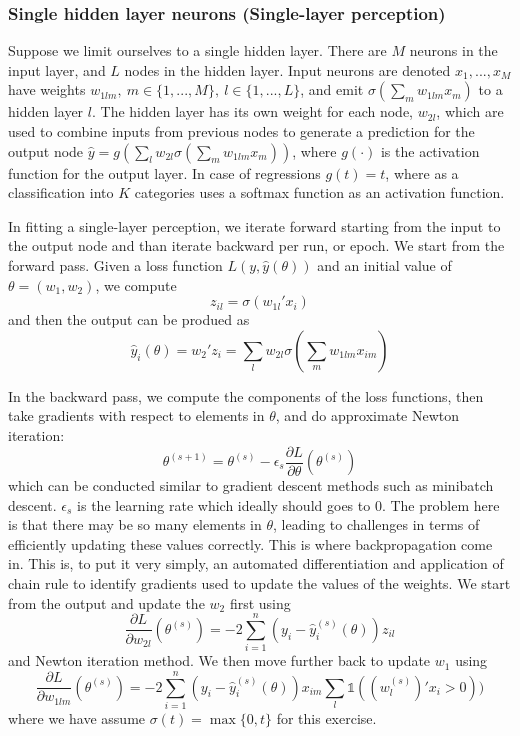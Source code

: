 \documentclass[12pt]{article}
\theoremstyle{definition}
\theoremstyle{property}
\theoremstyle{assumption}
\theoremstyle{example}
\theoremstyle{comment}
\begin{document}
\subsubsection{Single hidden layer neurons (Single-layer perception)}
Suppose we limit ourselves to a single hidden layer. There are $M$ neurons in the input layer, and $L$ nodes in the hidden layer. Input neurons are denoted $x_1,...,x_M$ have weights $w_{1lm},\ m\in\{1,...,M\},\ l\in\{1,...,L\}$, and emit $\sigma(\sum_{m} w_{1lm}x_m)$ to a hidden layer $l$. The hidden layer has its own weight for each node, $w_{2l}$, which are used to combine inputs from previous nodes to generate a prediction for the output node $\hat{y} = g\left(\sum_l w_{2l}\sigma(\sum_{m} w_{1lm}x_m)\right)$, where $g(\cdot)$ is the activation function for the output layer. In case of regressions $g(t)=t$, where as a classification into $K$ categories uses a softmax function as an activation function. \par
In fitting a single-layer perception, we iterate forward starting from the input to the output node and than iterate backward per run, or epoch. We start from the forward pass. Given a loss function $L(y,\hat{y}(\theta))$ and an initial value of $\theta=(w_1, w_2)$, we compute
\[
z_{il}=\sigma(w_{1l}'x_i)
\]
and then the output can be produed as
\[
\hat{y}_i(\theta) = w_2'z_i = \sum_l w_{2l}\sigma\left(\sum_{m} w_{1lm}x_{im}\right)
\] \par
In the backward pass, we compute the components of the loss functions, then take gradients with respect to elements in $\theta$, and do approximate Newton iteration:
\[
\theta^{(s+1)}=\theta^{(s)}-\epsilon_s\frac{\partial L}{\partial \theta}(\theta^{(s)})
\]
which can be conducted similar to gradient descent methods such as minibatch descent. $\epsilon_s$ is the learning rate which ideally should goes to 0. The problem here is that there may be so many elements in $\theta$, leading to challenges in terms of efficiently updating these values correctly.  This is where backpropagation come in. This is, to put it very simply, an automated differentiation and application of chain rule to identify gradients used to update the values of the weights. We start from the output and update the $w_2$ first using
\[
\frac{\partial L}{\partial w_{2l}}(\theta^{(s)}) = -2 \sum_{i=1}^n (y_i-\hat{y}_i^{(s)}(\theta))z_{il}
\]
and Newton iteration method. We then move further back to update $w_1$ using
\[
\frac{\partial L}{\partial w_{1lm}}(\theta^{(s)}) = -2 \sum_{i=1}^n (y_i-\hat{y}_i^{(s)}(\theta))x_{im}\sum_{l}\mathbb{1}((w_l^{(s)})'x_i>0 ))
\]
where we have assume $\sigma(t)=\max\{0,t\}$ for this exercise. 
\end{document}
